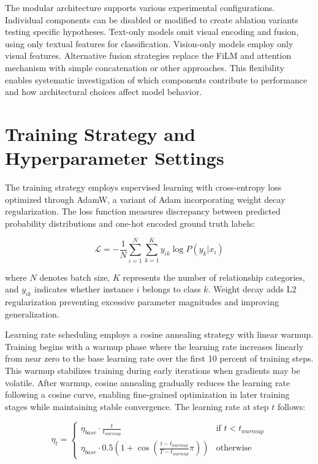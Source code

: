 \documentclass[12pt,a4paper]{report}
\begin{document}
The modular architecture supports various experimental configurations. Individual components can be disabled or modified to create ablation variants testing specific hypotheses. Text-only models omit visual encoding and fusion, using only textual features for classification. Vision-only models employ only visual features. Alternative fusion strategies replace the FiLM and attention mechanism with simple concatenation or other approaches. This flexibility enables systematic investigation of which components contribute to performance and how architectural choices affect model behavior.

\section{Training Strategy and Hyperparameter Settings}

The training strategy employs supervised learning with cross-entropy loss optimized through AdamW, a variant of Adam incorporating weight decay regularization. The loss function measures discrepancy between predicted probability distributions and one-hot encoded ground truth labels:

\begin{equation}
\mathcal{L} = -\frac{1}{N} \sum_{i=1}^N \sum_{k=1}^K y_{ik} \log P(y_k | x_i)
\end{equation}

where $N$ denotes batch size, $K$ represents the number of relationship categories, and $y_{ik}$ indicates whether instance $i$ belongs to class $k$. Weight decay adds L2 regularization preventing excessive parameter magnitudes and improving generalization.

Learning rate scheduling employs a cosine annealing strategy with linear warmup. Training begins with a warmup phase where the learning rate increases linearly from near zero to the base learning rate over the first 10 percent of training steps. This warmup stabilizes training during early iterations when gradients may be volatile. After warmup, cosine annealing gradually reduces the learning rate following a cosine curve, enabling fine-grained optimization in later training stages while maintaining stable convergence. The learning rate at step $t$ follows:

\begin{equation}
\eta_t = \begin{cases}
\eta_{base} \cdot \frac{t}{t_{warmup}} & \text{if } t < t_{warmup} \\
\eta_{base} \cdot 0.5 \left(1 + \cos\left(\frac{t - t_{warmup}}{T - t_{warmup}} \pi\right)\right) & \text{otherwise}
\end{cases}
\end{equation}
\end{document}
